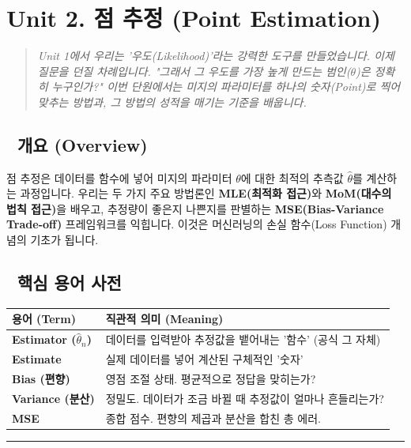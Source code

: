 \documentclass[11pt,a4paper]{book}
\theoremstyle{definition}
\begin{document}
\section{Unit 2. 점 추정 (Point Estimation)}

\begin{quote}
\textit{Unit 1에서 우리는 '우도(Likelihood)'라는 강력한 도구를 만들었습니다. 이제 질문을 던질 차례입니다. "그래서 그 우도를 가장 높게 만드는 범인($\theta$)은 정확히 누구인가?" 이번 단원에서는 미지의 파라미터를 하나의 숫자(Point)로 찍어 맞추는 방법과, 그 방법의 성적을 매기는 기준을 배웁니다.}
\end{quote}

\subsection*{📌 개요 (Overview)}
점 추정은 데이터를 함수에 넣어 미지의 파라미터 $\theta$에 대한 최적의 추측값 $\hat{\theta}$를 계산하는 과정입니다. 우리는 두 가지 주요 방법론인 \textbf{MLE(최적화 접근)}와 \textbf{MoM(대수의 법칙 접근)}을 배우고, 추정량이 좋은지 나쁜지를 판별하는 \textbf{MSE(Bias-Variance Trade-off)} 프레임워크를 익힙니다. 이것은 머신러닝의 손실 함수(Loss Function) 개념의 기초가 됩니다.

\subsection*{📝 핵심 용어 사전}
\begin{table}[h]
\centering
\begin{tabularx}{\textwidth}{|p{}|X|}
\hline
\textbf{용어 (Term)} & \textbf{직관적 의미 (Meaning)} \\
\hline
\textbf{Estimator ($\hat{\theta}_n$)} & 데이터를 입력받아 추정값을 뱉어내는 '함수' (공식 그 자체) \\
\hline
\textbf{Estimate} & 실제 데이터를 넣어 계산된 구체적인 '숫자' \\
\hline
\textbf{Bias (편향)} & 영점 조절 상태. 평균적으로 정답을 맞히는가? \\
\hline
\textbf{Variance (분산)} & 정밀도. 데이터가 조금 바뀔 때 추정값이 얼마나 흔들리는가? \\
\hline
\textbf{MSE} & 종합 점수. 편향의 제곱과 분산을 합친 총 에러. \\
\hline
\end{tabularx}
\end{table}

\vspace{0.5cm}\hrule\vspace{0.5cm}
\end{document}
